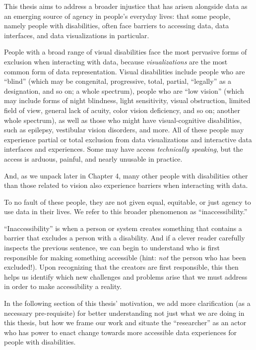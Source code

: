\documentclass[12pt]{cmuthesis}
\begin{document}
This thesis aims to address a broader injustice that has arisen alongside data as an emerging source of agency in people's everyday lives: that some people, namely people with disabilities, often face barriers to accessing data, data interfaces, and data visualizations in particular.

People with a broad range of visual disabilities face the most pervasive forms of exclusion when interacting with data, because \textit{visualizations} are the most common form of data representation. Visual disabilities include people who are ``blind'' (which may be congenital, progressive, total, partial, ``legally'' as a designation, and so on; a whole spectrum), people who are ``low vision'' (which may include forms of night blindness, light sensitivity, visual obstruction, limited field of view, general lack of acuity, color vision deficiency, and so on; another whole spectrum), as well as those who might have visual-cognitive disabilities, such as epilepsy, vestibular vision disorders, and more. All of these people may experience partial or total exclusion from data visualizations and interactive data interfaces and experiences. Some may have access \textit{technically speaking}, but the access is arduous, painful, and nearly unusable in practice.

And, as we unpack later in Chapter 4, many other people with disabilities other than those related to vision also experience barriers when interacting with data.

To no fault of these people, they are not given equal, equitable, or just agency to use data in their lives. We refer to this broader phenomenon as ``inaccessibility.''

``Inaccessibility'' is when a person or system creates something that contains a barrier that excludes a person with a disability. And if a clever reader carefully inspects the previous sentence, we can begin to understand who is first responsible for making something accessible (hint: \textit{not} the person who has been excluded!). Upon recognizing that the creators are first responsible, this then helps us identify which new challenges and problems arise that we must address in order to make accessibility a reality.

In the following section of this thesis' motivation, we add more clarification (as a necessary pre-requisite) for better understanding not just what we are doing in this thesis, but how we frame our work and situate the ``researcher'' as an actor who has power to enact change towards more accessible data experiences for people with disabilities.
\end{document}
